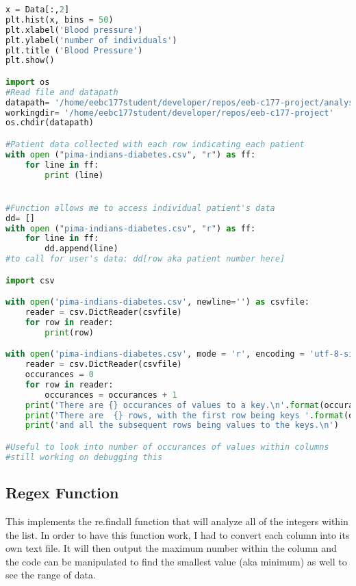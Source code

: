 \documentclass [letterpaper]{article}
\begin{document}
\begin{lstlisting}[language=Python]
x = Data[:,2]
plt.hist(x, bins = 50)
plt.xlabel('Blood pressure')
plt.ylabel('number of individuals')
plt.title ('Blood Pressure')
plt.show()

import os
#Read file and datapath
datapath= '/home/eebc177student/developer/repos/eeb-c177-project/analyses'
workingdir= '/home/eebc177student/developer/repos/eeb-c177-project'
os.chdir(datapath)

#Patient data collected with each row indicating each patient
with open ("pima-indians-diabetes.csv", "r") as ff: 
    for line in ff:
        print (line)


#Function allows me to access individual patient's data
dd= []
with open ("pima-indians-diabetes.csv", "r") as ff: 
    for line in ff:
        dd.append(line)
#to call for user's data: dd[row aka patient number here]

import csv

with open('pima-indians-diabetes.csv', newline='') as csvfile:
    reader = csv.DictReader(csvfile)
    for row in reader:
        print(row)

with open('pima-indians-diabetes.csv', mode = 'r', encoding = 'utf-8-sig') as csvfile:
    reader = csv.DictReader(csvfile)
    occurances = 0
    for row in reader:
        occurances = occurances + 1
    print('There are {} occurances of values to a key.\n'.format(occurances))
    print('There are  {} rows, with the first row being keys '.format(occurances+1))
    print('and all the subsequent rows being values to the keys.\n')

#Useful to look into number of occurances of values within columns
#still working on debugging this

\end{lstlisting}

\subsection{Regex Function}

This implements the re.findall function that will analyze all of the integers within the list. In order to have this function work, I had to convert each column into its own text file. It will then output the maximum number within the column and the code can be manipulated to find the smallest value (aka minimum) as well to see the range of data.
\end{document}
